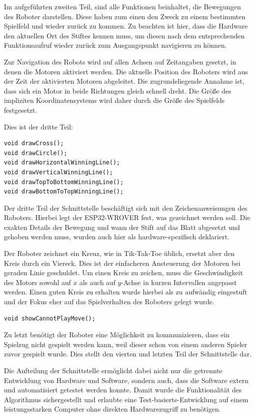 \documentclass[conference,compsoc,final,a4paper]{IEEEtran}
\begin{document}
Im aufgeführten zweiten Teil, sind alle Funktionen beinhaltet, die Bewegungen des Roboter darstellen. Diese haben
zum einen den Zweck zu einem bestimmten Spielfeld und wieder zurück zu kommen. Zu beachten ist hier,
dass die Hardware den aktuellen Ort des Stiftes kennen muss, um diesen nach dem entsprechenden Funktionsaufruf
wieder zurück zum Ausgangspunkt navigieren zu können.

Zur Navigation des Robots wird auf allen Achsen auf Zeitangaben gesetzt, in denen die Motoren aktiviert werden. Die
aktuelle Position des Roboters wird aus der Zeit der aktivierten Motoren abgeleitet. Die zugrundeliegende Annahme
ist, dass sich ein Motor in beide Richtungen gleich schnell dreht. Die Größe des impliziten Koordinatensystems wird
daher durch die Größe des Spielfelds festgesetzt.

Dies ist der dritte Teil:

\begin{verbatim}
void drawCross();
void drawCircle();
void drawHorizontalWinningLine();
void drawVerticalWinningLine();
void drawTopToBottomWinningLine();
void drawBottomToTopWinningLine();
\end{verbatim}

Der dritte Teil der Schnittstelle beschäftigt sich mit den Zeichenanweisungen des Roboters. Hierbei legt der
ESP32-WROVER fest, was gezeichnet werden soll. Die exakten Details der Bewegung und wann der Stift
auf das Blatt abgesetzt und gehoben werden muss, wurden auch hier als hardware-spezifisch deklariert.

Der Roboter zeichnet ein Kreuz, wie in Tik-Tak-Toe üblich, ersetzt aber den Kreis durch ein Viereck. Dies ist
der einfacheren Ansteuerung der Motoren bei geraden Linie geschuldet. Um einen Kreis zu zeichen, muss die
Geschwindigkeit des Motors sowohl auf $x$ als auch auf $y$-Achse in kurzen Intervallen angepasst werden. Einen 
guten Kreis zu erhalten wurde hierbei als zu aufwändig eingestuft und der Fokus eher auf das Spielverhalten
des Roboters gelegt wurde.

\begin{verbatim}
void showCannotPlayMove();
\end{verbatim}

Zu letzt benötigt der Roboter eine Möglichkeit zu kommunizieren, dass ein Spielzug nicht gespielt werden kann,
weil dieser schon von einem anderen Spieler zuvor gespielt wurde. Dies stellt den vierten und letzten Teil der
Schnittstelle dar.

Die Aufteilung der Schnittstelle ermöglicht dabei nicht nur die getrennte Entwicklung von Hardware und Software,
sondern auch, dass die Software extern und automatisiert getestet werden konnte. Damit wurde die Funktionalität des Algorithmus
sichergestellt und erlaubte eine Test-basierte-Entwicklung auf einem leistungsstarken Computer ohne direkten
Hardwarezugriff zu benötigen.
\end{document}
